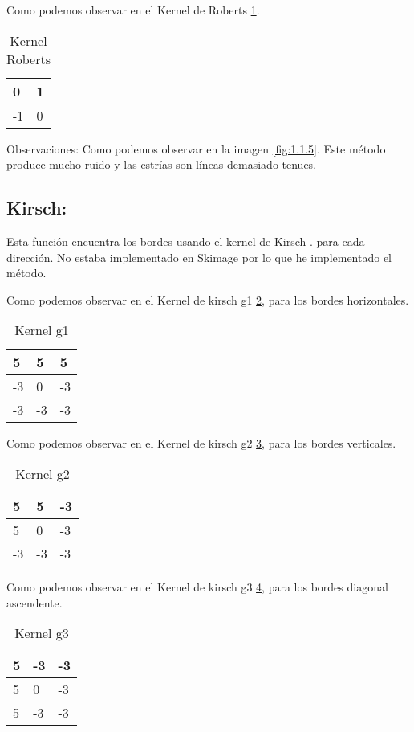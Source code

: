 Como podemos observar en el Kernel de Roberts \ref{F_k5}.
\begin{table}[]
	\centering
	\caption{Kernel Roberts}
	\label{F_k5}
	\begin{tabular}{|l|l|}
		\hline
		0  & 1 \\ \hline
		-1 & 0 \\ \hline
	\end{tabular}
\end{table}




Observaciones:
Como podemos observar en la imagen \ref{fig:1.1.5}.
Este método produce mucho ruido y las estrías son líneas demasiado tenues.

\subsection{Kirsch:}
Esta función encuentra los bordes usando el kernel de Kirsch \cite{wiki:Kirsch}.
para cada dirección.
No estaba implementado en Skimage por lo que he implementado el método.

Como podemos observar en el Kernel de kirsch g1 \ref{F_k6_1}, para los bordes horizontales.
\begin{table}[]
	\centering
	\caption{Kernel g1}
	\label{F_k6_1}
	\begin{tabular}{|l|l|l|}
		\hline
		5  & 5  & 5  \\ \hline
		-3 & 0  & -3 \\ \hline
		-3 & -3 & -3 \\ \hline
	\end{tabular}
\end{table}

Como podemos observar en el Kernel de kirsch g2 \ref{F_k6_2}, para los bordes verticales.
\begin{table}[]
	\centering
	\caption{Kernel g2}
	\label{F_k6_2}
	\begin{tabular}{|l|l|l|}
		\hline
		5  & 5  & -3  \\ \hline
		5 & 0  & -3 \\ \hline
		-3 & -3 & -3 \\ \hline
	\end{tabular}
\end{table}


Como podemos observar en el Kernel de kirsch g3 \ref{F_k6_3}, para los bordes diagonal ascendente.

\begin{table}[]
	\centering
	\caption{Kernel g3}
	\label{F_k6_3}
	\begin{tabular}{|l|l|l|}
		\hline
		5  & -3 & -3  \\ \hline
		5 & 0  & -3 \\ \hline
		5 & -3 & -3 \\ \hline
	\end{tabular}
\end{table}

